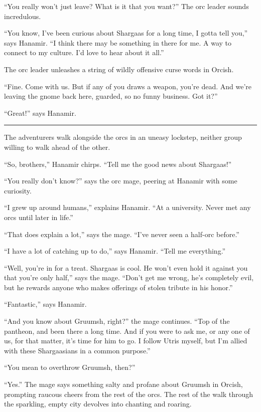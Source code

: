 \documentclass[smalldemyvopaper,11pt,twoside,onecolumn,openright,extrafontsizes]{memoir}
\begin{document}
``You really won't just leave? What is it that you want?'' The orc
leader sounds incredulous.

``You know, I've been curious about Shargaas for a long time, I gotta
tell you,'' says Hanamir. ``I think there may be something in there for
me. A way to connect to my culture. I'd love to hear about it all.''

The orc leader unleashes a string of wildly offensive curse words in
Orcish.

``Fine. Come with us. But if any of you draws a weapon, you're dead. And
we're leaving the gnome back here, guarded, so no funny business. Got
it?''

``Great!'' says Hanamir.

\begin{center}\rule{0.5\linewidth}{\linethickness}\end{center}

The adventurers walk alongside the orcs in an uneasy lockstep, neither
group willing to walk ahead of the other.

``So, brothers,'' Hanamir chirps. ``Tell me the good news about
Shargaas!''

``You really don't know?'' says the orc mage, peering at Hanamir with
some curiosity.

``I grew up around humans,'' explains Hanamir. ``At a university. Never
met any orcs until later in life.''

``That does explain a lot,'' says the mage. ``I've never seen a half-orc
before.''

``I have a lot of catching up to do,'' says Hanamir. ``Tell me
everything.''

``Well, you're in for a treat. Shargaas is cool. He won't even hold it
against you that you're only half,'' says the mage. ``Don't get me
wrong, he's completely evil, but he rewards anyone who makes offerings
of stolen tribute in his honor.''

``Fantastic,'' says Hanamir.

``And you know about Gruumsh, right?'' the mage continues. ``Top of the
pantheon, and been there a long time. And if you were to ask me, or any
one of us, for that matter, it's time for him to go. I follow Utris
myself, but I'm allied with these Shargaasians in a common purpose.''

``You mean to overthrow Gruumsh, then?''

``Yes.'' The mage says something salty and profane about Gruumsh in
Orcish, prompting raucous cheers from the rest of the orcs. The rest of
the walk through the sparkling, empty city devolves into chanting and
roaring.
\end{document}
